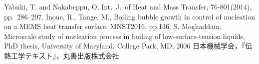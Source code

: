 \documentclass[a4paper,12pt,oneside]{jbook}
\begin{document}
\vspace{1zh}
\begin{thebibliography}{0}
\setlength{\parskip}{0mm}
\setlength{\itemsep}{0mm}
{Yabuki, T. and Nakabeppu, O, Int.~J.~of Heat and Mass Transfer, 76-801(2014), pp.~286--297.}
{Inoue, R., Tange, M., Boiling bubble growth in control of nucleation on a MEMS heat transfer surface, MNST2016, pp.136.}
{S. Moghaddam, Microscale study of nucleation process in boiling of low-surface-tension liquids, PhD thesis, University of Maryland, College Park, MD, 2006}
日本機械学会，『伝熱工学テキスト』，丸善出版株式会社
\end{thebibliography}
\end{document}
